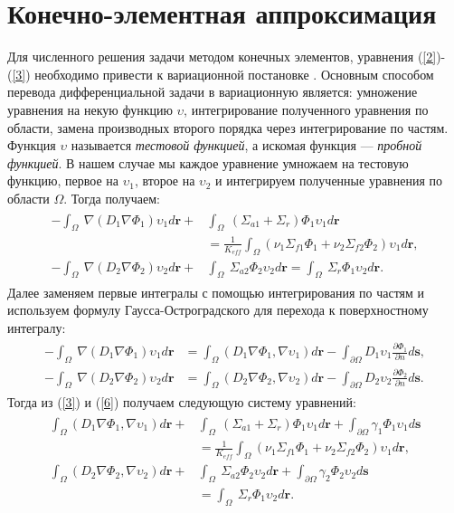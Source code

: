 \section{Конечно-элементная аппроксимация}
\label{s-2}
Для численного решения задачи методом конечных элементов, уравнения (\ref{2})-(\ref{3}) необходимо привести к вариационной постановке \cite{hebert}. Основным способом перевода дифференциальной задачи в вариационную является: умножение уравнения на некую функцию $\upsilon$, интегрирование полученного уравнения по области, замена производных второго порядка через интегрирование по частям.
Функция $\upsilon$ называется \textit{тестовой функцией}, а искомая функция --- \textit{пробной функцией}.
В нашем случае мы каждое уравнение умножаем на тестовую функцию, первое на $\upsilon_1$, второе на $\upsilon_2$ и интегрируем полученные уравнения по области $\Omega$. Тогда получаем:
\begin{align}\label{5}
\begin{split}
-\int_\Omega\ \nabla(D_1 \nabla \Phi_1)\upsilon_1 d\bm{r} + & \int_\Omega\ (\Sigma_{a1} + \Sigma_r) \Phi_1 \upsilon_1 d\bm{r}\\
& = \frac{1}{K_{eff}} \int_\Omega(\nu_1 \Sigma_{f1} \Phi_1 + \nu_2 \Sigma_{f2} \Phi_2) \upsilon_1 d\bm{r},\\
-\int_\Omega\ \nabla(D_2 \nabla \Phi_2)\upsilon_2 d\bm{r} + & \int_\Omega\ \Sigma_{a2} \Phi_2 \upsilon_2 d\bm{r} = \int_\Omega\ \Sigma_r \Phi_1 \upsilon_2 d\bm{r}.
\end{split}
\end{align}
Далее заменяем первые интегралы с помощью интегрирования по частям и используем формулу Гаусса-Остроградского для перехода к поверхностному интегралу:
\begin{align}\label{6}
\begin{split}
-\int_\Omega\ \nabla(D_1 \nabla \Phi_1) \upsilon_1 d\bm{r} & = \int_\Omega(D_1 \nabla \Phi_1, \nabla \upsilon_1) d\bm{r} - \int_{\partial \Omega} D_1 \upsilon_1 \frac{\partial \Phi_1}{\partial n}d\bm{s},\\
-\int_\Omega\ \nabla(D_2 \nabla \Phi_2) \upsilon_2 d\bm{r} & = \int_\Omega(D_2 \nabla \Phi_2, \nabla \upsilon_2) d\bm{r} - \int_{\partial \Omega} D_2 \upsilon_2 \frac{\partial \Phi_2}{\partial n}d\bm{s}.
\end{split}
\end{align}
Тогда из (\ref{3}) и (\ref{6}) получаем следующую систему уравнений:
\begin{align}\label{7}
\begin{split}
\int_\Omega (D_1 \nabla \Phi_1, \nabla \upsilon_1 ) d\bm{r} + &\int_\Omega\ (\Sigma_{a1} + \Sigma_r)\Phi_1 \upsilon_1 d\bm{r} + \int_{\partial \Omega} \gamma_1 \Phi_1 \upsilon_1 d\bm{s}\\
&= \frac{1}{K_{eff}} \int_\Omega (\nu_1 \Sigma_{f1} \Phi_1 + \nu_2 \Sigma_{f2} \Phi_2) \upsilon_1 d\bm{r},\\
\int_\Omega (D_2 \nabla \Phi_2, \nabla \upsilon_2 ) d\bm{r} + &\int_\Omega\ \Sigma_{a2} \Phi_2 \upsilon_2 d\bm{r} + \int_{\partial \Omega} \gamma_2 \Phi_2 \upsilon_2 d\bm{s}\\
&= \int_\Omega\ \Sigma_r \Phi_1 \upsilon_2 d\bm{r}.
\end{split}
\end{align}
